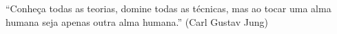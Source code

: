 
\vspace*{\fill}

\begin{citacao}
  ``Conheça todas as teorias, domine todas as técnicas, mas ao tocar uma alma humana seja apenas outra alma humana.''
  (Carl Gustav Jung)
\end{citacao}

\newpage